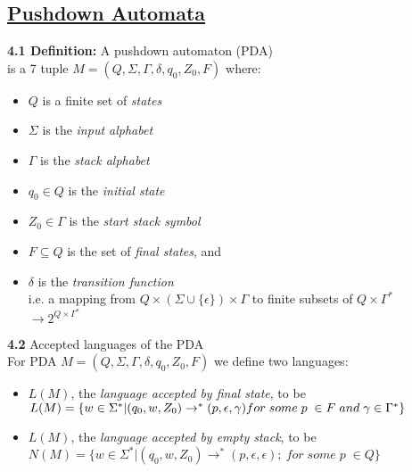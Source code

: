 \documentclass{article}
\begin{document}
\begin{multicols}{2}
\section{\underline{Pushdown Automata}}
\textbf{4.1 Definition:} A pushdown automaton (PDA) \\
is a 7 tuple $M =(Q, \Sigma, \Gamma, \delta, q_0, Z_0, F)$ where:
\begin{itemize}
    \setlength\itemsep{-0.4em}
    \item $Q$ is a finite set of \textit{states}
    \item $\Sigma$ is the \textit{input alphabet}
    \item $\Gamma$ is the \textit{stack alphabet}
    \item $q_0 \in Q$ is the \textit{initial state}
    \item $Z_0 \in \Gamma$ is the \textit{start stack symbol}
    \item $F \subseteq Q$ is the set of \textit{final states}, and
    \item $\delta$ is the \textit{transition function}\\
        i.e. a mapping from $Q \times (\Sigma \cup \{\epsilon\}) \times \Gamma$ to finite subsets of $Q \times \Gamma^*$\\
        $\rightarrow 2^{Q \times \Gamma^*}$
\end{itemize}
\textbf{4.2} Accepted languages of the PDA\\
For PDA $M =(Q, \Sigma, \Gamma, \delta, q_0, Z_0, F)$  we define two languages:
\begin{itemize}
    \item $L(M)$, the \textit{language accepted by final state}, to be \\
        \begin{math}
            L(M) = 
                \{
                    w \in \Sigma^* | (q_0, w, Z_0) \rightarrow^* (p, \epsilon, \gamma)$\\$
                    for\; some\; p\; \in F\; and\; \gamma \in \Gamma^*
                \}
        \end{math}
    \item $L(M)$, the \textit{language accepted by empty stack}, to be \\
        \begin{math}
            N(M) = 
                \{
                    w \in \Sigma^* | (q_0, w, Z_0) \rightarrow^* (p, \epsilon, \epsilon);\
                    for\; some\; p\; \in Q
                \}
        \end{math}
\end{itemize}


\end{multicols}
\end{document}
